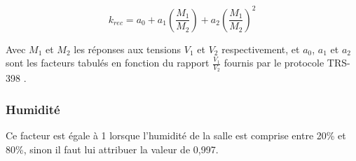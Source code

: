 \documentclass{article}
\begin{document}
\begin{equation}
  k_{rec} = a_0 + a_1 \left(\dfrac{M_1}{M_2}\right) + a_2 \left(\dfrac{M_1}{M_2}\right) ^2
  \label{eq_rec}
\end{equation}

Avec $M_1$ et $M_2$ les réponses aux tensions $V_1$ et $V_2$ respectivement, et $a_0$, $a_1$ et $a_2$ sont les facteurs tabulés en fonction du rapport $\frac{V_1}{V_2}$ fournis par le protocole TRS-398 \cite{international2001iaea}.

\subsubsection{Humidité}

Ce facteur est égale à 1 lorsque l'humidité de la salle est comprise entre 20\% et 80\%, sinon il faut lui attribuer la valeur de 0,997.

\clearpage


\nocite{*}
\end{document}
